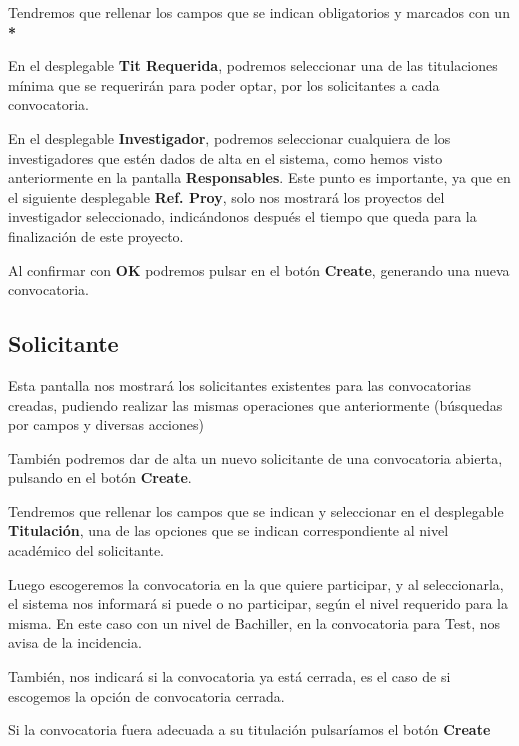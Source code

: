 Tendremos que rellenar los campos que se indican obligatorios y marcados con un \textbf{*}

En el desplegable \textbf{Tit Requerida}, podremos seleccionar una de las titulaciones mínima que se requerirán para poder optar, por los solicitantes a cada convocatoria.

En el desplegable \textbf{Investigador}, podremos seleccionar cualquiera de los investigadores que estén dados de alta en el sistema, como hemos visto anteriormente en la pantalla \textbf{Responsables}. Este punto es importante, ya que en el siguiente desplegable \textbf{Ref. Proy}, solo nos mostrará los proyectos del investigador seleccionado, indicándonos después el tiempo que queda para la finalización de este proyecto.

Al confirmar con \textbf{OK} podremos pulsar en el botón
\textbf{Create}, generando una nueva convocatoria.


\subsection{Solicitante}\label{solicitante}

Esta pantalla nos mostrará los solicitantes existentes para las convocatorias creadas, pudiendo realizar las mismas operaciones que anteriormente (búsquedas por campos y diversas acciones)

También podremos dar de alta un nuevo solicitante de una convocatoria abierta, pulsando en el botón \textbf{Create}.


Tendremos que rellenar los campos que se indican y seleccionar en el desplegable \textbf{Titulación}, una de las opciones que se indican correspondiente al nivel académico del solicitante.

Luego escogeremos la convocatoria en la que quiere participar, y al seleccionarla, el sistema nos informará si puede o no participar, según el nivel requerido para la misma. En este caso con un nivel de Bachiller, en la convocatoria para Test, nos avisa de la incidencia.


También, nos indicará si la convocatoria ya está cerrada, es el caso de si escogemos la opción de convocatoria cerrada.

Si la convocatoria fuera adecuada a su titulación pulsaríamos el botón \textbf{Create}

